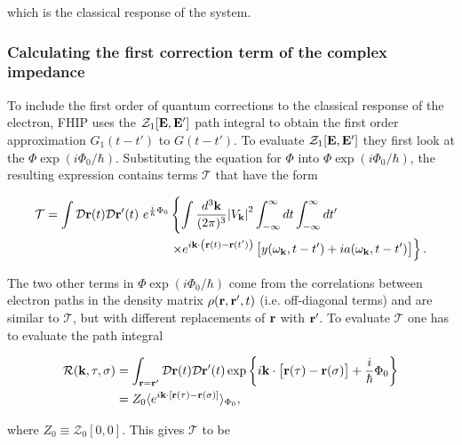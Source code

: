which is the classical response of the system. 

\subsubsection{Calculating the first correction term of the complex impedance}
\label{subsubsec:2-3-1-3}

To include the first order of quantum corrections to the classical response of the electron, FHIP uses the $\mathcal{Z}_1[\vb{E}, \vb{E'}]$ path integral to obtain the first order approximation $G_1(t-t')$ to $G(t-t')$. To evaluate $\mathcal{Z}_1[\vb{E}, \vb{E'}]$ they first look at the $\Phi \exp(i \Phi_0 / \hbar)$. Substituting the equation for $\Phi$ into $\Phi \exp(i \Phi_0 / \hbar)$, the resulting expression contains terms $\mathcal{T}$ that have the form

\begin{equation}
    \begin{aligned}
        \mathcal{T} = \int \mathcal{D}\vb{r}(t) \mathcal{D}\vb{r'}(t)\ e^{\frac{i}{\hbar} \Phi_0} &\left\{ \int \frac{d^3\vb{k}}{(2\pi)^3} \abs{V_{\vb{k}}}^2 \int^\infty_{-\infty} dt \int^\infty_{-\infty} dt' \right. \\ &\left. \times e^{i\vb{k}\cdot\left(\vb{r}(t) - \vb{r}(t')\right)} \left[ y(\omega_{\vb{k}}, t-t') + ia(\omega_{\vb{k}}, t-t') \right] \right\}.
    \end{aligned}
\end{equation}

The two other terms in $\Phi \exp(i \Phi_0 / \hbar)$ come from the correlations between electron paths in the density matrix $\rho(\vb{r}, \vb{r}', t)$ (i.e. off-diagonal terms) and are similar to $\mathcal{T}$, but with different replacements of $\vb{r}$ with $\vb{r'}$. To evaluate $\mathcal{T}$ one has to evaluate the path integral

\begin{equation}
    \begin{aligned}
    \mathcal{R}(\vb{k}, \tau, \sigma) &= \int_{\vb{r} = \vb{r'}} \mathcal{D}\vb{r}(t) \mathcal{D}\vb{r'}(t) \exp\left\{ i \vb{k} \cdot \left[ \vb{r}(\tau) - \vb{r}(\sigma) \right] + \frac{i}{\hbar} \Phi_0 \right\} \\
    &= Z_0 \langle e^{i \vb{k} \cdot [\vb{r}(\tau) - \vb{r}(\sigma)]}  \rangle_{\Phi_0},
    \end{aligned}
\end{equation}

where $Z_0 \equiv \mathcal{Z}_0[0, 0]$. This gives $\mathcal{T}$ to be

